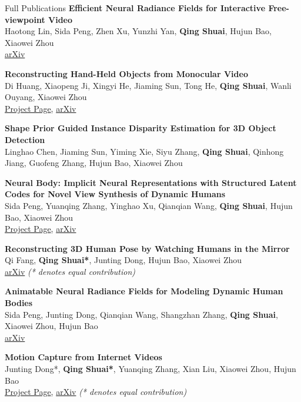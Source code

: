 \documentclass{resume}
\begin{document}
\begin{rSection}{Full Publications}
    {\bf Efficient Neural Radiance Fields for Interactive Free-viewpoint Video}\hfill{ } \\
    Haotong Lin, Sida Peng, Zhen Xu, Yunzhi Yan, \textbf{Qing Shuai}, Hujun Bao, Xiaowei Zhou\\
    \href{https://arxiv.org/abs/2112.01517}{arXiv}

    {\bf Reconstructing Hand-Held Objects from Monocular Video}\hfill{ } \\
    Di Huang, Xiaopeng Ji, Xingyi He, Jiaming Sun, Tong He, \textbf{Qing Shuai}, Wanli Ouyang, Xiaowei Zhou\\
    \href{https://dihuangdh.github.io/hhor/}{Project Page}, \href{https://arxiv.org/abs/2211.16835}{arXiv}

    {\bf Shape Prior Guided Instance Disparity Estimation for 3D Object Detection}\hfill{ } \\
    Linghao Chen, Jiaming Sun, Yiming Xie, Siyu Zhang, \textbf{Qing Shuai}, Qinhong Jiang, Guofeng Zhang, Hujun Bao, Xiaowei Zhou

    {\bf Neural Body: Implicit Neural Representations with Structured Latent Codes for Novel View Synthesis of Dynamic Humans}\hfill{ } \\
    Sida Peng, Yuanqing Zhang, Yinghao Xu, Qianqian Wang, \textbf{Qing Shuai}, Hujun Bao, Xiaowei Zhou\\
    \href{https://zju3dv.github.io/neuralbody/}{Project Page}, \href{https://arxiv.org/abs/2012.15838}{arXiv}

    {\bf Reconstructing 3D Human Pose by Watching Humans in the Mirror}\hfill{ } \\
    Qi Fang, \textbf{Qing Shuai*}, Junting Dong, Hujun Bao, Xiaowei Zhou\\
    \href{https://arxiv.org/abs/2104.00340}{arXiv} {\em (* denotes equal contribution)}

    {\bf Animatable Neural Radiance Fields for Modeling Dynamic Human Bodies}\hfill{ } \\
    Sida Peng, Junting Dong, Qianqian Wang, Shangzhan Zhang, \textbf{Qing Shuai}, Xiaowei Zhou, Hujun Bao\\
    \href{https://arxiv.org/abs/2105.02872}{arXiv}

    {\bf Motion Capture from Internet Videos}\hfill{ } \\
    Junting Dong*, \textbf{Qing Shuai*}, Yuanqing Zhang, Xian Liu, Xiaowei Zhou, Hujun Bao\\
    \href{https://zju3dv.github.io/iMoCap/}{Project Page}, \href{https://arxiv.org/abs/2008.07931}{arXiv} {\em (* denotes equal contribution)}

\end{rSection}
\end{document}
